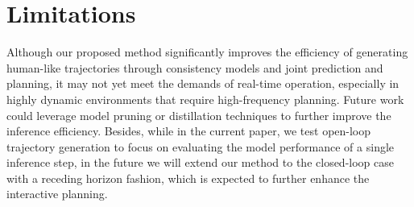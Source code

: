 \section{Limitations}

Although our proposed method significantly improves the efficiency of generating human-like trajectories through consistency models and joint prediction and planning, it may not yet meet the demands of real-time operation, especially in highly dynamic environments that require high-frequency planning.
Future work could leverage model pruning or distillation techniques to further improve the inference efficiency.
Besides, while in the current paper, we test open-loop trajectory generation to focus on evaluating the model performance of a single inference step, in the future we will extend our method to the closed-loop case with a receding horizon fashion,  which is expected to further enhance the interactive planning.

